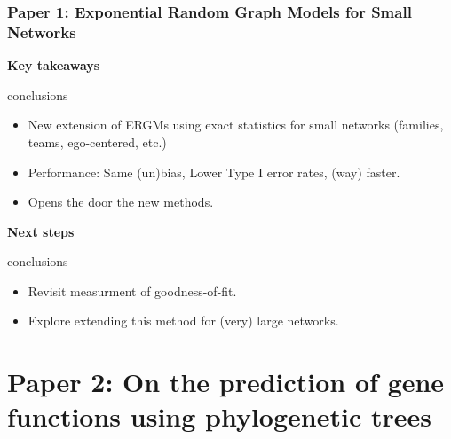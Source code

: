 \documentclass[aspectratio=169, 9pt, handout]{beamer}\usepackage[]{graphicx}\usepackage[]{color}
\def\cursection{\frame{\frametitle{Contents}\tableofcontents[current]}}
\begin{document}
\begin{frame}
\frametitle{Paper 1: Exponential Random Graph Models for Small Networks}

{\bf \large Key takeaways}
\begin{beamercolorbox}[dp=1ex]{conclusions}
\begin{itemize}[<+->]
\item New extension of ERGMs using exact statistics for small networks
(families, teams, ego-centered, etc.)
\item Performance: Same (un)bias, Lower Type I error rates, (way) faster.
\item Opens the door the new methods.
\end{itemize}
\end{beamercolorbox}

\vfill\pause

{\bf \large Next steps}
\begin{beamercolorbox}[dp=1ex]{conclusions}
\begin{itemize}[<+->]
\item Revisit measurment of goodness-of-fit.
\item Explore extending this method for (very) large networks.
\end{itemize}
\end{beamercolorbox}




\end{frame}


\section{Paper 2: On the prediction of gene functions using phylogenetic trees}
\cursection
\end{document}
